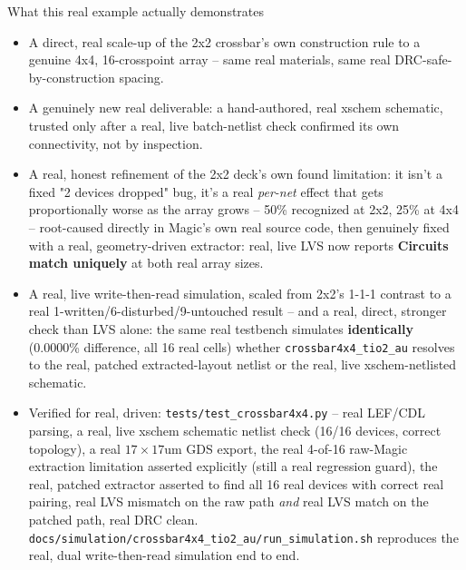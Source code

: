 \documentclass[aspectratio=169,9pt]{beamer}
\begin{document}
\begin{frame}{What this real example actually demonstrates}
\footnotesize
\begin{itemize}
  \item A direct, real scale-up of the 2x2 crossbar's own construction
        rule to a genuine 4x4, 16-crosspoint array -- same real
        materials, same real DRC-safe-by-construction spacing.
  \item A genuinely new real deliverable: a hand-authored, real xschem
        schematic, trusted only after a real, live batch-netlist check
        confirmed its own connectivity, not by inspection.
  \item A real, honest refinement of the 2x2 deck's own found
        limitation: it isn't a fixed "2 devices dropped" bug, it's a
        real \emph{per-net} effect that gets proportionally worse as
        the array grows -- 50\% recognized at 2x2, 25\% at 4x4 --
        root-caused directly in Magic's own real source code, then
        genuinely fixed with a real, geometry-driven extractor: real,
        live LVS now reports \textbf{Circuits match uniquely} at both
        real array sizes.
  \item A real, live write-then-read simulation, scaled from 2x2's
        1-1-1 contrast to a real 1-written/6-disturbed/9-untouched
        result -- and a real, direct, stronger check than LVS alone:
        the same real testbench simulates \textbf{identically}
        (0.0000\% difference, all 16 real cells) whether
        \texttt{crossbar4x4\_tio2\_au} resolves to the real, patched
        extracted-layout netlist or the real, live xschem-netlisted
        schematic.
  \item Verified for real, driven: \texttt{tests/test\_crossbar4x4.py}
        -- real LEF/CDL parsing, a real, live xschem schematic
        netlist check (16/16 devices, correct topology), a real
        $17\times17$um GDS export, the real 4-of-16 raw-Magic
        extraction limitation asserted explicitly (still a real
        regression guard), the real, patched extractor asserted to
        find all 16 real devices with correct real pairing, real LVS
        mismatch on the raw path \emph{and} real LVS match on the
        patched path, real DRC clean.
        \texttt{docs/simulation/crossbar4x4\_tio2\_au/run\_simulation.sh}
        reproduces the real, dual write-then-read simulation end to
        end.
\end{itemize}
\end{frame}
\end{document}
